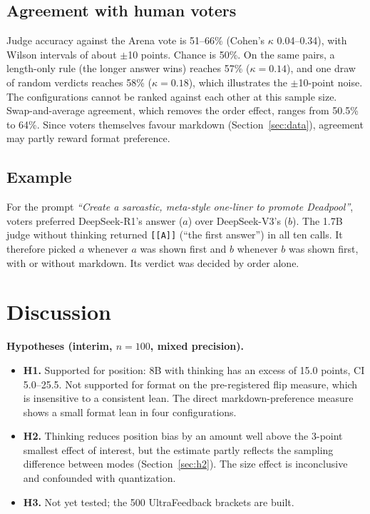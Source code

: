 \documentclass[10pt]{article}
\begin{document}
\subsection{Agreement with human voters}
Judge accuracy against the Arena vote is 51--66\% (Cohen's $\kappa$ 0.04--0.34), with Wilson intervals of about
$\pm$10 points. Chance is 50\%. On the same pairs, a length-only rule (the longer answer wins) reaches 57\%
($\kappa=0.14$), and one draw of random verdicts reaches 58\% ($\kappa=0.18$), which illustrates the
$\pm$10-point noise. The configurations cannot be ranked against each other at this sample size. Swap-and-average
agreement, which removes the order effect, ranges from 50.5\% to 64\%. Since voters themselves favour markdown
(Section~\ref{sec:data}), agreement may partly reward format preference.

\subsection{Example}
For the prompt \emph{``Create a sarcastic, meta-style one-liner to promote Deadpool''}, voters preferred
DeepSeek-R1's answer ($a$) over DeepSeek-V3's ($b$). The 1.7B judge without thinking returned \texttt{[[A]]}
(``the first answer'') in all ten calls. It therefore picked $a$ whenever $a$ was shown first and $b$ whenever $b$
was shown first, with or without markdown. Its verdict was decided by order alone.

\section{Discussion}
\label{sec:disc}
\textbf{Hypotheses (interim, $n=100$, mixed precision).}
\begin{itemize}
\item \textbf{H1.} Supported for position: 8B with thinking has an excess of 15.0 points, CI 5.0--25.5.
Not supported for format on the pre-registered flip measure, which is insensitive to a consistent lean. The direct
markdown-preference measure shows a small format lean in four configurations.
\item \textbf{H2.} Thinking reduces position bias by an amount well above the 3-point smallest effect of interest,
but the estimate partly reflects the sampling difference between modes (Section~\ref{sec:h2}). The size effect is
inconclusive and confounded with quantization.
\item \textbf{H3.} Not yet tested; the 500 UltraFeedback brackets are built.
\end{itemize}
\end{document}
